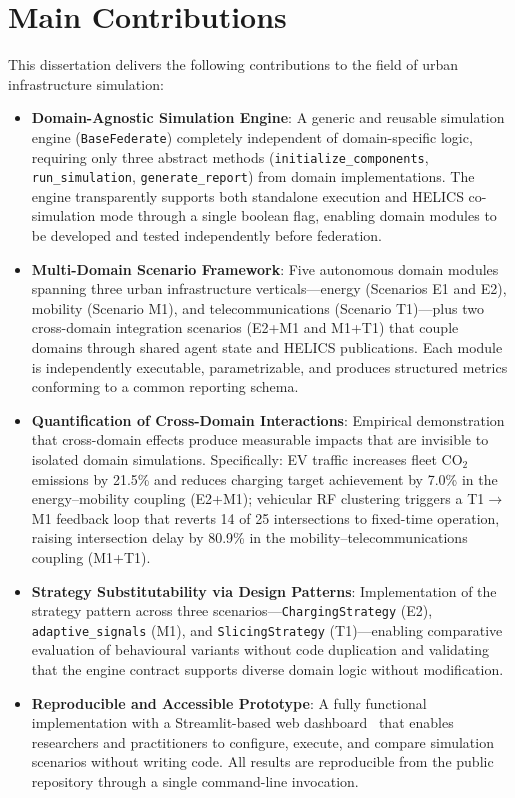 \section{Main Contributions}

This dissertation delivers the following contributions to the field of urban infrastructure simulation:

\begin{itemize}
    \item \textbf{Domain-Agnostic Simulation Engine}: A generic and reusable simulation engine (\texttt{BaseFederate}) completely independent of domain-specific logic, requiring only three abstract methods (\texttt{initialize\_components}, \texttt{run\_simulation}, \texttt{generate\_report}) from domain implementations. The engine transparently supports both standalone execution and HELICS co-simulation mode through a single boolean flag, enabling domain modules to be developed and tested independently before federation.

    \item \textbf{Multi-Domain Scenario Framework}: Five autonomous domain modules spanning three urban infrastructure verticals---energy (Scenarios E1 and E2), mobility (Scenario M1), and telecommunications (Scenario T1)---plus two cross-domain integration scenarios (E2+M1 and M1+T1) that couple domains through shared agent state and HELICS publications. Each module is independently executable, parametrizable, and produces structured metrics conforming to a common reporting schema.

    \item \textbf{Quantification of Cross-Domain Interactions}: Empirical demonstration that cross-domain effects produce measurable impacts that are invisible to isolated domain simulations. Specifically: EV traffic increases fleet CO$_2$ emissions by 21.5\% and reduces charging target achievement by 7.0\% in the energy--mobility coupling (E2+M1); vehicular RF clustering triggers a T1$\rightarrow$M1 feedback loop that reverts 14 of 25 intersections to fixed-time operation, raising intersection delay by 80.9\% in the mobility--telecommunications coupling (M1+T1).

    \item \textbf{Strategy Substitutability via Design Patterns}: Implementation of the strategy pattern across three scenarios---\texttt{ChargingStrategy} (E2), \texttt{adaptive\_signals} (M1), and \texttt{SlicingStrategy} (T1)---enabling comparative evaluation of behavioural variants without code duplication and validating that the engine contract supports diverse domain logic without modification.

    \item \textbf{Reproducible and Accessible Prototype}: A fully functional implementation with a Streamlit-based web dashboard~\cite{streamlit} that enables researchers and practitioners to configure, execute, and compare simulation scenarios without writing code. All results are reproducible from the public repository through a single command-line invocation.
\end{itemize}


